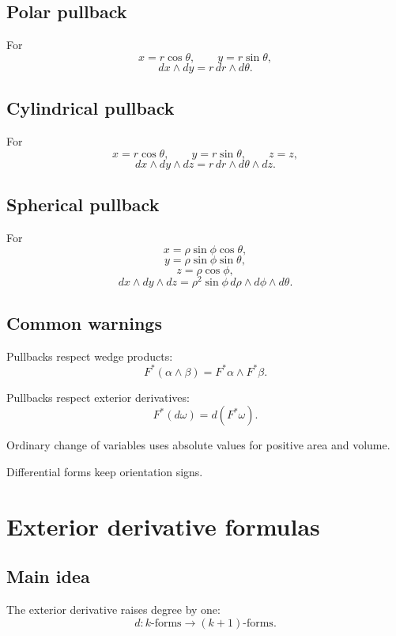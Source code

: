 \subsection*{Polar pullback}

For
\[
    x=r\cos\theta,
    \qquad
    y=r\sin\theta,
\]
\[
\boxed{
    dx\wedge dy
    =
    r\,dr\wedge d\theta.
}
\]

\subsection*{Cylindrical pullback}

For
\[
    x=r\cos\theta,
    \qquad
    y=r\sin\theta,
    \qquad
    z=z,
\]
\[
\boxed{
    dx\wedge dy\wedge dz
    =
    r\,dr\wedge d\theta\wedge dz.
}
\]

\subsection*{Spherical pullback}

For
\[
    x=\rho\sin\phi\cos\theta,
\]
\[
    y=\rho\sin\phi\sin\theta,
\]
\[
    z=\rho\cos\phi,
\]
\[
\boxed{
    dx\wedge dy\wedge dz
    =
    \rho^2\sin\phi\,
    d\rho\wedge d\phi\wedge d\theta.
}
\]

\subsection*{Common warnings}

Pullbacks respect wedge products:
\[
\boxed{
    F^*(\alpha\wedge\beta)=F^*\alpha\wedge F^*\beta.
}
\]

Pullbacks respect exterior derivatives:
\[
\boxed{
    F^*(d\omega)=d(F^*\omega).
}
\]

Ordinary change of variables uses absolute values for positive area and volume.

Differential forms keep orientation signs.

\section{Exterior derivative formulas}
\label{app:E.4}

\subsection*{Main idea}

The exterior derivative raises degree by one:
\[
\boxed{
    d:\text{\(k\)-forms}\longrightarrow \text{\((k+1)\)-forms}.
}
\]

